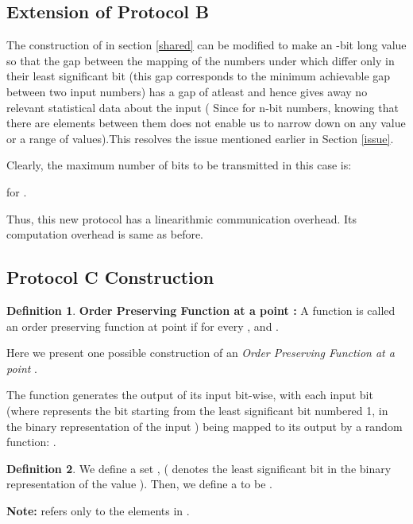 \documentclass[11pt, letterpaper, romanappendices, onecolumn]{article}
\theoremstyle{plain}\newtheorem{thm}{Theorem}[section]
\theoremstyle{definition}
\newtheorem{defn}{Definition}[section]
\theoremstyle{remark}
\begin{document}
\subsection{Extension of Protocol \textsf{B}}\label{sec:ext}
The construction of  in section \ref{shared} can be modified to make  an -bit long value so that the gap between the mapping of the numbers under  which differ only in their least significant bit (this gap corresponds to the minimum achievable gap between two input numbers) has a gap of atleast  and hence gives away no relevant statistical data about the input ( Since for n-bit numbers, knowing that there are  elements between them does not enable us to narrow down on any value or a range of values).This resolves the issue mentioned earlier in Section \ref{issue}.

\par Clearly, the maximum number of bits to be transmitted in this case is:

for .

\par Thus, this new protocol has a linearithmic communication overhead. Its computation overhead is same as before.

\subsection{Protocol \textsf{C} Construction}
\begin{defn}
\textbf{Order Preserving Function at a point :} A function  is called an order preserving function at point  if for every ,  and . 
\end{defn}

\par Here we present one possible construction of an \textit{Order Preserving Function at a point }. 

\par The function  generates the output of its input  bit-wise, with each input bit  (where  represents the  bit starting from the least significant bit numbered 1, in the binary representation of the input ) being mapped to its output by a random function: .
\begin{defn}\label{definerise}
We define a set , ( denotes the  least significant bit in the binary representation of the value  ). Then, we define a  to be . 
\end{defn}

\par \textbf{Note:}  refers only to the elements in .
 
\end{document}
